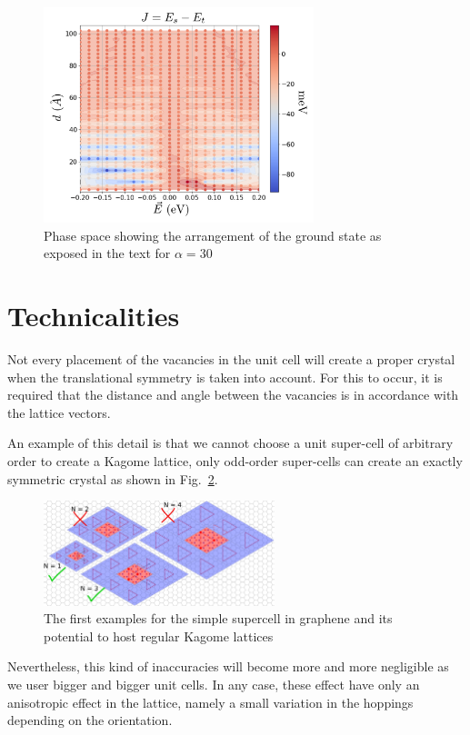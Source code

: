 \begin{figure}[h!]
\centering
  \includegraphics[width=0.7\textwidth]{artlat/fig/phase_J30.pdf}
\vspace{-5pt}
\caption{Phase space showing the arrangement of the ground state as exposed in the text for $\alpha=30$}
\label{}
\end{figure}
\FloatBarrier



\newpage
\appendix
\section{Technicalities}
Not every placement of the vacancies in the unit cell will create a proper crystal when the translational symmetry is taken into account. For this to occur, it is required that the distance and angle between the vacancies is in accordance with the lattice vectors.

An example of this detail is that we cannot choose a unit super-cell of arbitrary order to create a Kagome lattice, only odd-order super-cells can create an exactly symmetric crystal as shown in Fig.~\ref{kagome}.
\begin{figure}[h!]
  \centering
  \includegraphics[width=0.6\textwidth]{artlat/fig/kagome_scale.pdf}
  \vspace{-5pt}
  \caption{The first examples for the simple supercell in graphene and its potential to host regular Kagome lattices}
  \label{kagome}
\end{figure}
\FloatBarrier
Nevertheless, this kind of inaccuracies will become more and more negligible as we user bigger and bigger unit cells.
In any case, these effect have only an anisotropic effect in the lattice, namely a small variation in the hoppings depending on the orientation.

